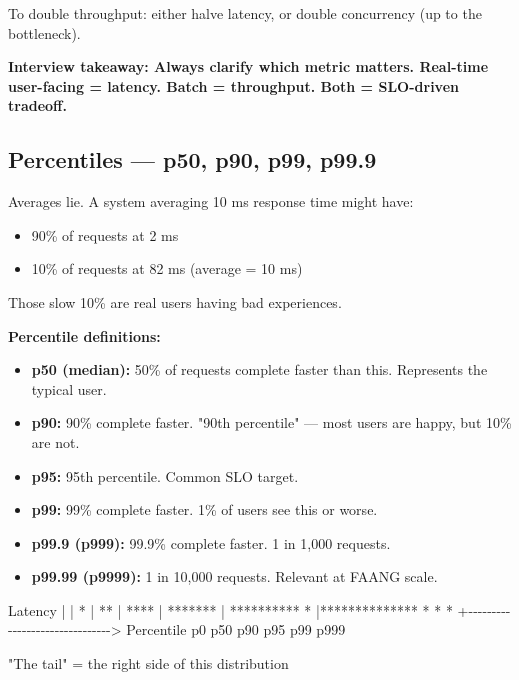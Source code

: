 \documentclass[11pt]{article}
\providecommand{\tightlist}{\setlength{\itemsep}{1pt}\setlength{\parskip}{0pt}}
\newenvironment{Shaded}{\begin{snugshade}}{\end{snugshade}}
\newcommand{\CommentTok}[1]{\textcolor[rgb]{0.48,0.49,0.49}{#1}}
\newcommand{\NormalTok}[1]{\textcolor[rgb]{0.81,0.81,0.76}{#1}}
\newcommand{\OperatorTok}[1]{\textcolor[rgb]{0.81,0.81,0.76}{#1}}
\begin{document}
To double throughput: either halve latency, or double concurrency (up to the bottleneck).

\textbf{Interview takeaway: Always clarify which metric matters. Real-time user-facing = latency. Batch = throughput. Both = SLO-driven tradeoff.}

\subsection{Percentiles --- p50, p90, p99, p99.9}\label{percentiles--p50-p90-p99-p999}


Averages lie. A system averaging 10 ms response time might have:

\begin{itemize}
\tightlist
\item
  90\% of requests at 2 ms
\item
  10\% of requests at 82 ms (average = 10 ms)
\end{itemize}

Those slow 10\% are real users having bad experiences.

\textbf{Percentile definitions:}

\begin{itemize}
\tightlist
\item
  \textbf{p50 (median):} 50\% of requests complete faster than this. Represents the typical user.
\item
  \textbf{p90:} 90\% complete faster. "90th percentile" --- most users are happy, but 10\% are not.
\item
  \textbf{p95:} 95th percentile. Common SLO target.
\item
  \textbf{p99:} 99\% complete faster. 1\% of users see this or worse.
\item
  \textbf{p99.9 (p999):} 99.9\% complete faster. 1 in 1,000 requests.
\item
  \textbf{p99.99 (p9999):} 1 in 10,000 requests. Relevant at FAANG scale.
\end{itemize}


\begin{Shaded}
\begin{Highlighting}[]
\NormalTok{Latency}
  \OperatorTok{|}
  \OperatorTok{|}      \OperatorTok{*}
  \OperatorTok{|}      \OperatorTok{**}
  \OperatorTok{|}     \OperatorTok{****}
  \OperatorTok{|}   \OperatorTok{*******}
  \OperatorTok{|} \OperatorTok{**********}   \OperatorTok{*}
  \OperatorTok{|**************}  \OperatorTok{*}  \OperatorTok{*}   \OperatorTok{*}
  \OperatorTok{+{-}{-}{-}{-}{-}{-}{-}{-}{-}{-}{-}{-}{-}{-}{-}{-}{-}{-}{-}{-}{-}{-}{-}{-}{-}{-}{-}{-}{-}{-}{-}\textgreater{}}\NormalTok{ Percentile}
\NormalTok{  p0   p50   p90 p95 p99 p999}

 \CommentTok{"The tail"} \OperatorTok{=}\NormalTok{ the right side of this distribution}
\end{Highlighting}
\end{Shaded}
\end{document}
